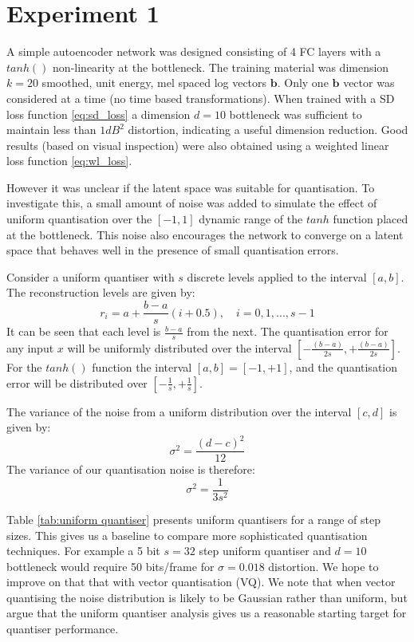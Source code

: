 \documentclass{article}
\begin{document}
\section{Experiment 1}

A simple autoencoder network was designed consisting of 4 FC layers with a $tanh()$ non-linearity at the bottleneck.  The training material was dimension $k=20$ smoothed, unit energy, mel spaced log vectors $\mathbf{b}$.  Only one $\mathbf{b}$ vector was considered at a time (no time based transformations). When trained with a SD loss function \ref{eq:sd_loss} a dimension $d=10$ bottleneck was sufficient to maintain less than $1 dB^2$ distortion, indicating a useful dimension reduction.  Good results (based on visual inspection) were also obtained using a weighted linear loss function \ref{eq:wl_loss}.

However it was unclear if the latent space was suitable for quantisation. To investigate this, a small amount of noise was added to simulate the effect of uniform quantisation over the $[-1,1]$ dynamic range of the $tanh$ function placed at the bottleneck.  This noise also encourages the network to converge on a latent space that behaves well in the presence of small quantisation errors.

Consider a uniform quantiser with $s$ discrete levels applied to the interval $[a,b]$.  The reconstruction levels are given by:
\begin{equation}
r_i = a + \frac{b-a}{s}(i+0.5), \quad i=0,1,...,s-1
\end{equation}
It can be seen that each level is $\frac{b-a}{s}$ from the next.  The quantisation error for any input $x$ will be uniformly distributed over the interval $[-\frac{(b-a)}{2s},+\frac{(b-a)}{2s}]$.  For the 
$tanh()$ function the interval $[a,b]=[-1,+1]$, and the quantisation error will be distributed over $[-\frac{1}{s}, + \frac{1}{s}]$. 

The variance of the noise from a uniform distribution over the interval $[c,d]$ is given by:
\begin{equation}
\sigma^2 = \frac{(d-c)^2}{12}
\end{equation}
The variance of our quantisation noise is therefore:
\begin{equation}
\sigma^2 = \frac{1}{3s^2}
\end{equation}

Table \ref{tab:uniform quantiser} presents uniform quantisers for a range of step sizes.  This gives us a baseline to compare more sophisticated quantisation techniques.  For example a 5 bit $s=32$ step uniform quantiser and $d=10$ bottleneck would require 50 bits/frame for $\sigma=0.018$ distortion. We hope to improve on that that with vector quantisation (VQ). We note that when vector quantising the noise distribution is likely to be Gaussian rather than uniform, but argue that the uniform quantiser analysis gives us a reasonable starting target for quantiser performance.
\end{document}
